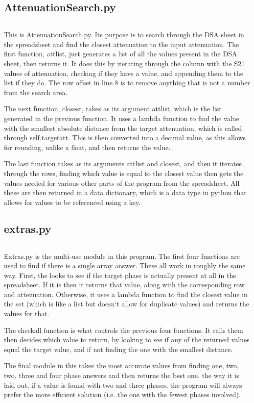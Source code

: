 \documentclass{article}
\begin{document}
\subsection{AttenuationSearch.py}
\inputminted[linenos, breaklines]{python}{../AttenuationSearch.py}
This is AttenuationSearch.py. Its purpose is to search through the DSA sheet in the spreadsheet and find the closest attenuation to the input attenuation. The first function,
attlist, just generates a list of all the values present in the DSA sheet, then returns it. It does this by iterating through the column with the S21 values of attenuation,
checking if they have a value, and appending them to the list if they do. The row offset in line 8 is to remove anything that is not a number from the search area.\par The next
function, closest, takes as its argument attlist, which is the list generated in the previous function. It uses a lambda function to find the value with the smallest absolute
distance from the target attenuation, which is called through self.targetatt. This is then converted into a decimal value, as this allows for rounding, unlike a float, and then
returns the value.\par The last function takes as its arguments attlist and closest, and then it iterates through the rows, finding which value is equal to the closest value
then gets the values needed for various other parts of the program from the spreadsheet. All these are then returned in a data dictionary, which is a data type in python that
allows for values to be referenced using a key.
\subsection{extras.py}
\inputminted[linenos, breaklines]{python}{../extras.py}
Extras.py is the multi-use module in this program. The first four functions are used to find if there is a single array answer. These all work in roughly the same way. First, the
looks to see if the target phase is actually present at all in the spreadsheet. If it is then it returns that value, along with the corresponding row and attenuation. Otherwise,
it uses a lambda function to find the closest value in the set (which is like a list but doesn`t allow for duplicate values) and returns the values for that. \par The checkall function
is what controls the previous four functions. It calls them then decides which value to return, by looking to see if any of the returned values equal the target value, and if not finding
the one with the smallest distance. \par The final module in this takes the most accurate values from finding one, two, two, three and four phase answers and then returns the best one.
the way it is laid out, if a value is found with two and three phases, the program will always prefer the more efficient solution (i.e. the one with the fewest phases involved).
\end{document}
